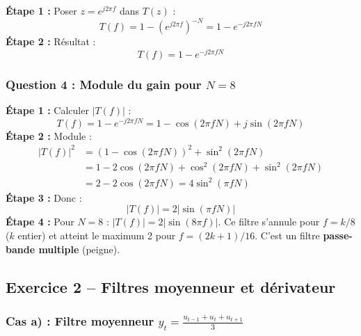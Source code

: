 \documentclass[12pt,a4paper]{article}
\newcommand{\step}[1]{\textcolor{coursbleu}{\textbf{Étape #1 :}}}
\newcommand{\encadre}[1]{\boxed{#1}}
\begin{document}
\begin{tcolorbox}[corrbox, title=Correction Q3]
\step{1} Poser $z = e^{j2\pi f}$ dans $T(z)$ :
\[
  T(f) = 1 - \left(e^{j2\pi f}\right)^{-N} = 1 - e^{-j2\pi fN}
\]
\step{2} Résultat :
\[
  \encadre{T(f) = 1 - e^{-j2\pi fN}}
\]
\end{tcolorbox}

\subsubsection*{Question 4 : Module du gain pour $N = 8$}

\begin{tcolorbox}[corrbox, title=Correction Q4]
\step{1} Calculer $|T(f)|$ :
\[
  T(f) = 1 - e^{-j2\pi fN}
       = 1 - \cos(2\pi fN) + j\sin(2\pi fN)
\]
\step{2} Module :
\begin{align*}
  |T(f)|^2 &= (1-\cos(2\pi fN))^2 + \sin^2(2\pi fN) \\
            &= 1 - 2\cos(2\pi fN) + \cos^2(2\pi fN) + \sin^2(2\pi fN) \\
            &= 2 - 2\cos(2\pi fN) = 4\sin^2(\pi fN)
\end{align*}
\step{3} Donc :
\[
  \encadre{|T(f)| = 2\left|\sin(\pi fN)\right|}
\]
\step{4} Pour $N = 8$ : $|T(f)| = 2|\sin(8\pi f)|$.
Ce filtre s'annule pour $f = k/8$ ($k$ entier) et atteint le maximum 2 pour $f = (2k+1)/16$.
C'est un filtre \textbf{passe-bande multiple} (peigne).
\end{tcolorbox}

\subsection{Exercice 2 -- Filtres moyenneur et dérivateur}

\subsubsection*{Cas a) : Filtre moyenneur $y_t = \frac{u_{t-1}+u_t+u_{t+1}}{3}$}
\end{document}
